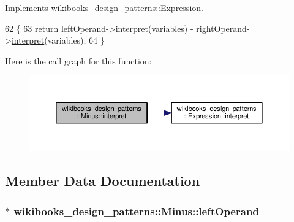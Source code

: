 Implements \hyperlink{structwikibooks__design__patterns_1_1Expression_a3723a35bb367b43edf806be72385c680}{wikibooks\+\_\+design\+\_\+patterns\+::\+Expression}.


\begin{DoxyCode}
62                                   \{ 
63         \textcolor{keywordflow}{return} \hyperlink{classwikibooks__design__patterns_1_1Minus_af0a888e3e728165e0142bf230f0c2366}{leftOperand}->\hyperlink{structwikibooks__design__patterns_1_1Expression_a3723a35bb367b43edf806be72385c680}{interpret}(variables) - 
      \hyperlink{classwikibooks__design__patterns_1_1Minus_af555c67688bb374cb76ed7d99aa67220}{rightOperand}->\hyperlink{structwikibooks__design__patterns_1_1Expression_a3723a35bb367b43edf806be72385c680}{interpret}(variables);
64     \}
\end{DoxyCode}


Here is the call graph for this function\+:
\nopagebreak
\begin{figure}[H]
\begin{center}
\leavevmode
\includegraphics[width=350pt]{classwikibooks__design__patterns_1_1Minus_a6f2e1d5e4281ecee45dff5859af3978f_cgraph}
\end{center}
\end{figure}




\subsection{Member Data Documentation}
\subsubsection[{\texorpdfstring{left\+Operand}{leftOperand}}]{$\ast$ wikibooks\+\_\+design\+\_\+patterns\+::\+Minus\+::left\+Operand\hspace{0.3cm}{\ttfamily [private]}}\hypertarget{classwikibooks__design__patterns_1_1Minus_af0a888e3e728165e0142bf230f0c2366}{}\label{classwikibooks__design__patterns_1_1Minus_af0a888e3e728165e0142bf230f0c2366}
